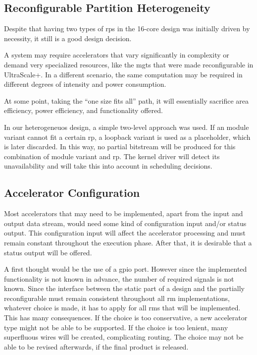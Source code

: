 \subsection{Reconfigurable Partition Heterogeneity}

Despite that having two types of \glspl{rp} in the 16-core design was initially driven by necessity,
it still is a good design decision.

A system may require accelerators that vary significantly in complexity or demand very specialized resources, 
like the \glspl{mgt} that were made reconfigurable in UltraScale+.
In a different scenario, the same computation may be required in different
degrees of intensity and power consumption.

At some point, taking the ``one size fits all'' path, it will essentially sacrifice
area efficiency, power efficiency, and functionality offered.

In our heterogeneuos design, a simple two-level approach was used.
If an module variant cannot fit a certain \gls{rp},
a loopback variant is used as a placeholder, which is later discarded.
In this way, no partial bitstream will be produced for this combination of module variant and \gls{rp}.
The kernel driver will detect its unavailability and will take this into account in scheduling decisions.

\subsection{Accelerator Configuration}

Most accelerators that may need to be implemented, apart from the input
and output data stream, would need some kind of configuration input and/or
status output. This configuration input will affect the accelerator processing
and must remain constant throughout the execution phase. After that,
it is desirable that a status output will be offered.

A first thought would be the use of a \gls{gpio} port. However since the
implemented functionality is not known in advance, the number of required
signals is not known. Since the interface between the static part of a design
and the partially reconfigurable must remain consistent throughout all \gls{rm} implementations,
whatever choice is made, it has to apply for all \glspl{rm} that will be implemented.
This has many consequences. If the choice is too conservative, a new accelerator type
might not be able to be supported. If the choice is too lenient, many superfluous
wires will be created, complicating routing. The choice may not be able to be revised afterwards,
if the final product is released.

